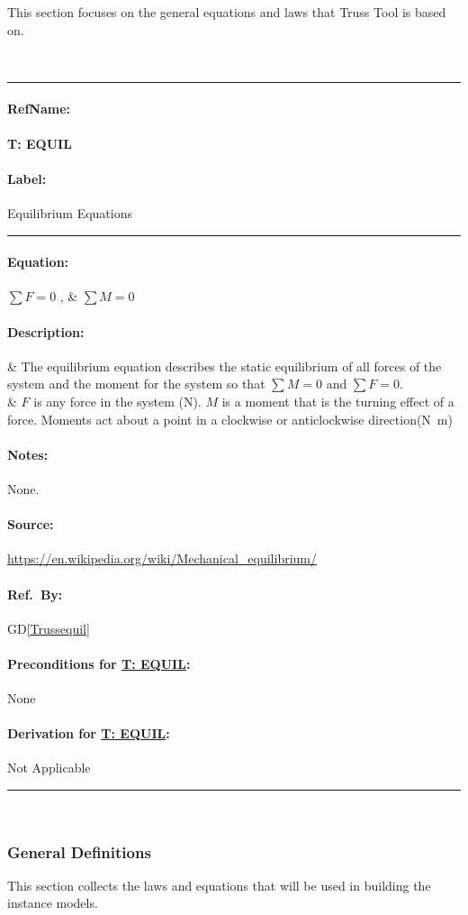 \documentclass[12pt]{article}
\newcommand{\dref}[1]{GD\ref{#1}}
\newcommand{\deftheory}[9][Not Applicable]
{
\newpage
\noindent \rule{\textwidth}{0.5mm}

\paragraph{RefName: } \textbf{#2} \phantomsection 
\label{#2}

\paragraph{Label:} #3

\noindent \rule{\textwidth}{0.5mm}

\paragraph{Equation:}

#4

\paragraph{Description:}

#5

\paragraph{Notes:}

#6

\paragraph{Source:}

#7

\paragraph{Ref.\ By:}

#8

\paragraph{Preconditions for \hyperref[#2]{#2}:}
\label{#2_precond}

#9

\paragraph{Derivation for \hyperref[#2]{#2}:}
\label{#2_deriv}

#1

\noindent \rule{\textwidth}{0.5mm}

}
\begin{document}

This section focuses on the general equations and laws that Truss Tool is based on. 

~\newline

\noindent
\deftheory
{T: EQUIL}
{ Equilibrium Equations}
{
$\sum F = 0$ ,  & $\sum M = 0$\\
 
}
{  
   
 
  & The equilibrium equation describes the static equilibrium of all  forces of the system and the moment for the system so that $\sum M =0$ and $\sum F=0$.\\
  & $F$ is any force in the system (\si{\newton}). $M$ is a moment that is the turning effect of a force. Moments act about a point in a clockwise or anticlockwise direction(\si{\newton\metre})\\
}
{ 
None.
}
{
  \url{https://en.wikipedia.org/wiki/Mechanical_equilibrium/}
}
{
  \dref{Trussequil}
}
{
None
}
{}

\newpage
~\newline

\subsubsection{General Definitions}\label{sec_gendef}

This section collects the laws and equations that will be used in building the
instance models.
~\newline
\end{document}
